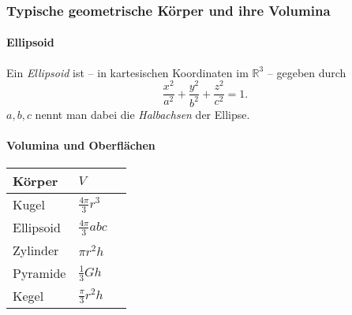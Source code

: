 \documentclass[a4paper, 9pt, DIV=24]{scrartcl}
\newcommand{\R}{\mathbb{R}}
\begin{document}
\subsubsection{Typische geometrische Körper und ihre Volumina}
\paragraph{Ellipsoid}
Ein \emph{Ellipsoid} ist -- in kartesischen Koordinaten im $\R^3$ -- gegeben durch
\[ \frac{x^2}{a^2} + \frac{y^2}{b^2} + \frac{z^2}{c^2} = 1. \]
$a,b,c$ nennt man dabei die \emph{Halbachsen} der Ellipse.

\paragraph{Volumina und Oberflächen}

\begin{tabular}{lll}
 \textbf{Körper} & $V$ \\\hline
 Kugel & $\frac{4\pi}{3}r^3$ \\
 Ellipsoid & $\frac{4\pi}{3}abc$ \\
 Zylinder & $\pi r^2h$ \\
 Pyramide & $\frac{1}{3}Gh$ \\
 Kegel & $\frac{\pi}{3}r^2h$ \\
\end{tabular}
\end{document}
